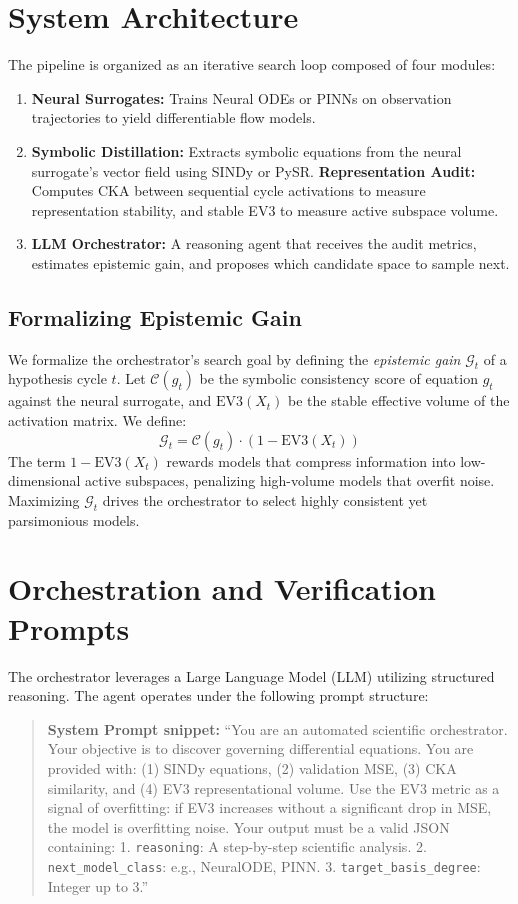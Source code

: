\documentclass{article}
\begin{document}
\section{System Architecture}
\label{sec:arch}
The pipeline is organized as an iterative search loop composed of four modules:
\begin{enumerate}
    \item \textbf{Neural Surrogates:} Trains Neural ODEs or PINNs on observation trajectories to yield differentiable flow models.
    \item \textbf{Symbolic Distillation:} Extracts symbolic equations from the neural surrogate's vector field using SINDy or PySR.
    \textbf{Representation Audit:} Computes CKA between sequential cycle activations to measure representation stability, and stable EV3 to measure active subspace volume.
    \item \textbf{LLM Orchestrator:} A reasoning agent that receives the audit metrics, estimates epistemic gain, and proposes which candidate space to sample next.
\end{enumerate}

\subsection{Formalizing Epistemic Gain}
We formalize the orchestrator's search goal by defining the \textit{epistemic gain} $\mathcal{G}_t$ of a hypothesis cycle $t$. Let $\mathcal{C}(g_t)$ be the symbolic consistency score of equation $g_t$ against the neural surrogate, and $\text{EV3}(X_t)$ be the stable effective volume of the activation matrix. We define:
\begin{equation}
    \mathcal{G}_t = \mathcal{C}(g_t) \cdot \left(1 - \text{EV3}(X_t)\right)
\end{equation}
The term $1 - \text{EV3}(X_t)$ rewards models that compress information into low-dimensional active subspaces, penalizing high-volume models that overfit noise. Maximizing $\mathcal{G}_t$ drives the orchestrator to select highly consistent yet parsimonious models.

\section{Orchestration and Verification Prompts}
The orchestrator leverages a Large Language Model (LLM) utilizing structured reasoning. The agent operates under the following prompt structure:

\begin{quote}
\small
\textbf{System Prompt snippet:}
``You are an automated scientific orchestrator. Your objective is to discover governing differential equations. You are provided with: (1) SINDy equations, (2) validation MSE, (3) CKA similarity, and (4) EV3 representational volume.
Use the EV3 metric as a signal of overfitting: if EV3 increases without a significant drop in MSE, the model is overfitting noise.
Your output must be a valid JSON containing:
1. \texttt{reasoning}: A step-by-step scientific analysis.
2. \texttt{next\_model\_class}: e.g., NeuralODE, PINN.
3. \texttt{target\_basis\_degree}: Integer up to 3.''
\end{quote}
\end{document}
